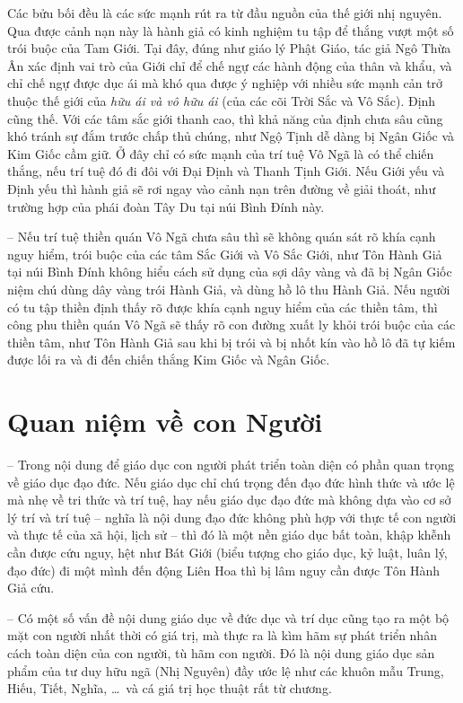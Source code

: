 Các bửu bối đều là các sức mạnh rút ra từ đầu nguồn của thế giới nhị nguyên. Qua được cảnh nạn này là hành giả có kinh nghiệm tu tập để thắng vượt một số trói buộc của Tam Giới. Tại đây, đúng như giáo lý Phật Giáo, tác giả Ngô Thừa Ân xác định vai trò của Giới chỉ để chế ngự các hành động của thân và khẩu, và chỉ chế ngự được dục ái mà khó qua được ý nghiệp với nhiều sức mạnh cản trở thuộc thế giới của \emph{hữu ái và vô hữu ái} (của các cõi Trời Sắc và Vô Sắc). Định cũng thế. Với các tâm sắc giới thanh cao, thì khả năng của định chưa sâu cũng khó tránh sự đắm trước chấp thủ chúng, như Ngộ Tịnh dễ dàng bị Ngân Giốc và Kim Giốc cầm giữ. Ở đây chỉ có sức mạnh của trí tuệ Vô Ngã là có thể chiến thắng, nếu trí tuệ đó đi đôi với Đại Định và Thanh Tịnh Giới. Nếu Giới yếu và Định yếu thì hành giả sẽ rơi ngay vào cảnh nạn trên đường về giải thoát, như trường hợp của phái đoàn Tây Du tại núi Bình Đính này.

-- Nếu trí tuệ thiền quán Vô Ngã chưa sâu thì sẽ không quán sát rõ khía cạnh nguy hiểm, trói buộc của các tâm Sắc Giới và Vô Sắc Giới, như Tôn Hành Giả tại núi Bình Đính không hiểu cách sử dụng của sợi dây vàng và đã bị Ngân Giốc niệm chú dùng dây vàng trói Hành Giả, và dùng hồ lô thu Hành Giả. Nếu người có tu tập thiền định thấy rõ được khía cạnh nguy hiểm của các thiền tâm, thì công phu thiền quán Vô Ngã sẽ thấy rõ con đường xuất ly khỏi trói buộc của các thiền tâm, như Tôn Hành Giả sau khi bị trói và bị nhốt kín vào hồ lô đã tự kiếm được lối ra và đi đến chiến thắng Kim Giốc và Ngân Giốc.

\section{Quan niệm về con Người} %
\label{sec:33_34_con_nguoi}

-- Trong nội dung để giáo dục con người phát triển toàn diện có phần quan trọng về giáo dục đạo đức. Nếu giáo dục chỉ chú trọng đến đạo đức hình thức và ước lệ mà nhẹ về tri thức và trí tuệ, hay nếu giáo dục đạo đức mà không dựa vào cơ sở lý trí và trí tuệ -- nghĩa là nội dung đạo đức không phù hợp với thực tế con người và thực tế của xã hội, lịch sử -- thì đó là một nền giáo dục bất toàn, khập khễnh cần được cứu nguy, hệt như Bát Giới (biểu tượng cho giáo dục, kỷ luật, luân lý, đạo đức) đi một mình đến động Liên Hoa thì bị lâm nguy cần được Tôn Hành Giả cứu.

-- Có một số vấn đề nội dung giáo dục về đức dục và trí dục cũng tạo ra một bộ mặt con người nhất thời có giá trị, mà thực ra là kìm hãm sự phát triển nhân cách toàn diện của con người, tù hãm con người. Đó là nội dung giáo dục sản phẩm của tư duy hữu ngã (Nhị Nguyên) đầy ước lệ như các khuôn mẫu Trung, Hiếu, Tiết, Nghĩa, \ldots ~và cá giá trị học thuật rất từ chương.

